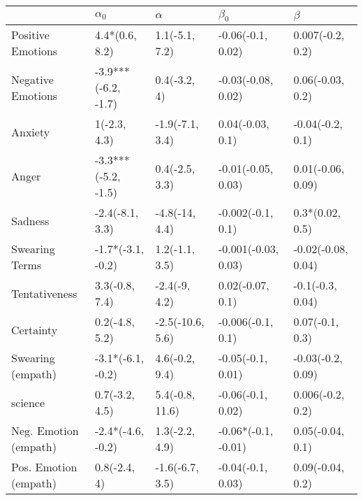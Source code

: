 \begin{tabular}{lllll}
\toprule
{} &           $\alpha_0$ &          $\alpha$ &            $\beta_0$ &             $\beta$ \\
\midrule
Positive Emotions     &       4.4*(0.6, 8.2) &    1.1(-5.1, 7.2) &    -0.06(-0.1, 0.02) &    0.007(-0.2, 0.2) \\
Negative Emotions     &  -3.9***(-6.2, -1.7) &      0.4(-3.2, 4) &   -0.03(-0.08, 0.02) &    0.06(-0.03, 0.2) \\
Anxiety               &         1(-2.3, 4.3) &   -1.9(-7.1, 3.4) &     0.04(-0.03, 0.1) &    -0.04(-0.2, 0.1) \\
Anger                 &  -3.3***(-5.2, -1.5) &    0.4(-2.5, 3.3) &   -0.01(-0.05, 0.03) &   0.01(-0.06, 0.09) \\
Sadness               &      -2.4(-8.1, 3.3) &    -4.8(-14, 4.4) &    -0.002(-0.1, 0.1) &     0.3*(0.02, 0.5) \\
Swearing Terms        &    -1.7*(-3.1, -0.2) &    1.2(-1.1, 3.5) &  -0.001(-0.03, 0.03) &  -0.02(-0.08, 0.04) \\
Tentativeness         &       3.3(-0.8, 7.4) &     -2.4(-9, 4.2) &     0.02(-0.07, 0.1) &    -0.1(-0.3, 0.04) \\
Certainty             &       0.2(-4.8, 5.2) &  -2.5(-10.6, 5.6) &    -0.006(-0.1, 0.1) &     0.07(-0.1, 0.3) \\
Swearing (empath)     &    -3.1*(-6.1, -0.2) &    4.6(-0.2, 9.4) &    -0.05(-0.1, 0.01) &   -0.03(-0.2, 0.09) \\
science               &       0.7(-3.2, 4.5) &   5.4(-0.8, 11.6) &    -0.06(-0.1, 0.02) &    0.006(-0.2, 0.2) \\
Neg. Emotion (empath) &    -2.4*(-4.6, -0.2) &    1.3(-2.2, 4.9) &  -0.06*(-0.1, -0.01) &    0.05(-0.04, 0.1) \\
Pos. Emotion (empath) &         0.8(-2.4, 4) &   -1.6(-6.7, 3.5) &    -0.04(-0.1, 0.03) &    0.09(-0.04, 0.2) \\
\bottomrule
\end{tabular}

